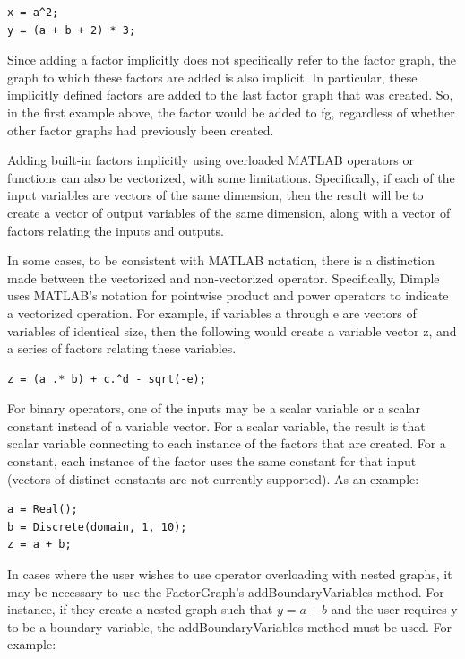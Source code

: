 \begin{lstlisting}
x = a^2;
y = (a + b + 2) * 3;
\end{lstlisting}

Since adding a factor implicitly does not specifically refer to the factor graph, the graph to which these factors are added is also implicit.  In particular, these implicitly defined factors are added to the last factor graph that was created.  So, in the first example above, the factor would be added to fg, regardless of whether other factor graphs had previously been created.

Adding built-in factors implicitly using overloaded MATLAB operators or functions can also be vectorized, with some limitations.  Specifically, if each of the input variables are vectors of the same dimension, then the result will be to create a vector of output variables of the same dimension, along with a vector of factors relating the inputs and outputs.

In some cases, to be consistent with MATLAB notation, there is a distinction made between the vectorized and non-vectorized operator.  Specifically, Dimple uses MATLAB's notation for pointwise product and power operators to indicate a vectorized operation.  For example, if variables a through e are vectors of variables of identical size, then the following would create a variable vector z, and a series of factors relating these variables.

\begin{lstlisting}
z = (a .* b) + c.^d - sqrt(-e);
\end{lstlisting}

For binary operators, one of the inputs may be a scalar variable or a scalar constant instead of a variable vector.  For a scalar variable, the result is that scalar variable connecting to each instance of the factors that are created.  For a constant, each instance of the factor uses the same constant for that input (vectors of distinct constants are not currently supported).  As an example:

\begin{lstlisting}
a = Real();
b = Discrete(domain, 1, 10);
z = a + b;					
\end{lstlisting}

In cases where the user wishes to use operator overloading with nested graphs, it may be necessary to use the FactorGraph's addBoundaryVariables method.  For instance, if they create a nested graph such that $y = a+b$ and the user requires y to be a boundary variable, the addBoundaryVariables method must be used.  For example:

